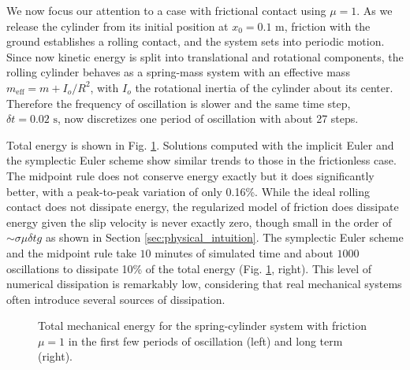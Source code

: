 We now focus our attention to a case with frictional contact using $\mu=1$. As
we release the cylinder from its initial position at $x_0=0.1\text{ m}$,
friction with the ground establishes a rolling contact, and the system sets into
periodic motion. Since now kinetic energy is split into translational and
rotational components, the rolling cylinder behaves as a spring-mass system with
an effective mass $m_\text{eff}=m+I_o/R^2$, with $I_o$ the rotational inertia of
the cylinder about its center. Therefore the frequency of oscillation is slower
and the same time step, $\delta t=0.02\text{ s}$, now discretizes one period of
oscillation with about 27 steps.

Total energy is shown in Fig. \ref{fig:spring_cylinder_energy}. Solutions
computed with the implicit Euler and the symplectic Euler scheme show similar
trends to those in the frictionless case. The midpoint rule does not conserve
energy exactly but it does significantly better, with a peak-to-peak variation
of only 0.16\%. While the ideal rolling contact does not dissipate energy, the
regularized model of friction does dissipate energy given the slip velocity is
never exactly zero, though small in the order of $\sim\sigma\mu\delta t g$ as
shown in Section \ref{sec:physical_intuition}. The symplectic Euler scheme and
the midpoint rule take $10$ minutes of simulated time and about $1000$
oscillations to dissipate 10\% of the total energy (Fig.
\ref{fig:spring_cylinder_energy}, right). This level of numerical dissipation is
remarkably low, considering that real mechanical systems often introduce several
sources of dissipation.
\begin{figure}[!h]
    \centering
    \caption{\label{fig:spring_cylinder_energy} 
    Total mechanical energy for the spring-cylinder system with friction $\mu=1$
    in the first few periods of oscillation (left) and long term (right).}
\end{figure}

